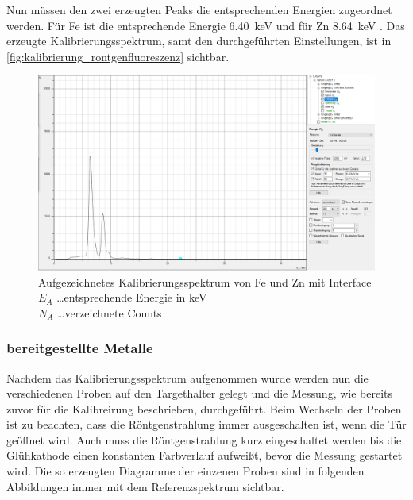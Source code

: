 \documentclass[12pt,english,ngerman]{scrartcl}
\begin{document}
Nun müssen den zwei erzeugten Peaks die entsprechenden Energien zugeordnet
werden. Für Fe ist die entsprechende Energie \SI{6.40}{keV} und für Zn
\SI{8.64}{keV} \cite{unterlagen_rontgenfluorenzenz}. Das erzeugte
Kalibrierungsspektrum, samt den durchgeführten Einstellungen, ist in
\autoref{fig:kalibrierung_rontgenfluoreszenz} sichtbar.

\begin{figure}[H]
	\begin{center}
		\includegraphics[width =\textwidth]{./figures/roentgen/FeZnKalibrierung.PNG}
	\end{center}
	\caption[Aufgezeichnetes Kalibrierungsspektrum mit Interface] {\footnotesize
		Aufgezeichnetes Kalibrierungsspektrum von Fe und Zn mit Interface \\
		$E_A$ \dots entsprechende Energie in keV                          \\
		$N_A$ \dots verzeichnete Counts
	}\label{fig:kalibrierung_rontgenfluoreszenz}
\end{figure}

\subsubsection{bereitgestellte Metalle}

Nachdem das Kalibrierungsspektrum aufgenommen wurde werden nun die
verschiedenen Proben auf den Targethalter gelegt und die Messung, wie bereits
zuvor für die Kalibreirung beschrieben, durchgeführt. Beim Wechseln der Proben
ist zu beachten, dass die Röntgenstrahlung immer ausgeschalten ist, wenn die
Tür geöffnet wird. Auch muss die Röntgenstrahlung kurz eingeschaltet werden bis
die Glühkathode einen konstanten Farbverlauf aufweißt, bevor die Messung
gestartet wird. Die so erzeugten Diagramme der einzenen Proben sind in
folgenden Abbildungen immer mit dem Referenzspektrum sichtbar.
\end{document}
